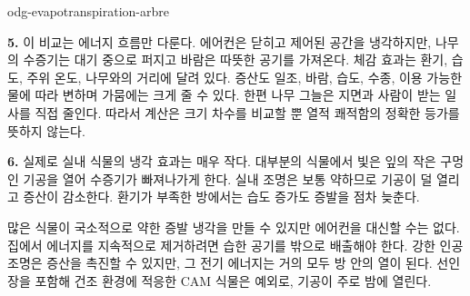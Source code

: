\begin{exo}{odg-evapotranspiration-arbre}
\begin{solution}
\textbf{5.} 이 비교는 에너지 흐름만 다룬다. 에어컨은 닫히고 제어된 공간을 냉각하지만, 나무의 수증기는 대기 중으로 퍼지고 바람은 따뜻한 공기를 가져온다. 체감 효과는 환기, 습도, 주위 온도, 나무와의 거리에 달려 있다. 증산도 일조, 바람, 습도, 수종, 이용 가능한 물에 따라 변하며 가뭄에는 크게 줄 수 있다. 한편 나무 그늘은 지면과 사람이 받는 일사를 직접 줄인다. 따라서 계산은 크기 차수를 비교할 뿐 열적 쾌적함의 정확한 등가를 뜻하지 않는다.

\textbf{6.} 실제로 실내 식물의 냉각 효과는 매우 작다. 대부분의 식물에서 빛은 잎의 작은 구멍인 기공을 열어 수증기가 빠져나가게 한다. 실내 조명은 보통 약하므로 기공이 덜 열리고 증산이 감소한다. 환기가 부족한 방에서는 습도 증가도 증발을 점차 늦춘다.

많은 식물이 국소적으로 약한 증발 냉각을 만들 수 있지만 에어컨을 대신할 수는 없다. 집에서 에너지를 지속적으로 제거하려면 습한 공기를 밖으로 배출해야 한다. 강한 인공 조명은 증산을 촉진할 수 있지만, 그 전기 에너지는 거의 모두 방 안의 열이 된다. 선인장을 포함해 건조 환경에 적응한 CAM 식물은 예외로, 기공이 주로 밤에 열린다.
\end{solution}
\end{exo}

